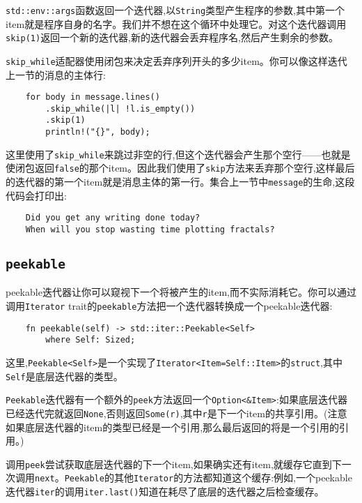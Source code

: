 \texttt{std::env::args}函数返回一个迭代器,以\texttt{String}类型产生程序的参数,其中第一个item就是程序自身的名字。我们并不想在这个循环中处理它。对这个迭代器调用\texttt{skip(1)}返回一个新的迭代器,新的迭代器会丢弃程序名,然后产生剩余的参数。

\texttt{skip\_while}适配器使用闭包来决定丢弃序列开头的多少item。你可以像这样迭代上一节的消息的主体行:
\begin{verbatim}
    for body in message.lines()
        .skip_while(|l| !l.is_empty())
        .skip(1)
        println!("{}", body);
\end{verbatim}

这里使用了\texttt{skip\_while}来跳过非空的行,但这个迭代器会产生那个空行——也就是使闭包返回\texttt{false}的那个item。因此我们使用了\texttt{skip}方法来丢弃那个空行,这样最后的迭代器的第一个item就是消息主体的第一行。集合上一节中\texttt{message}的生命,这段代码会打印出:
\begin{verbatim}
    Did you get any writing done today?
    When will you stop wasting time plotting fractals?
\end{verbatim}

\subsection{\texttt{peekable}}
peekable迭代器让你可以窥视下一个将被产生的item,而不实际消耗它。你可以通过调用\texttt{Iterator} trait的\texttt{peekable}方法把一个迭代器转换成一个peekable迭代器:
\begin{verbatim}
    fn peekable(self) -> std::iter::Peekable<Self>
        where Self: Sized;
\end{verbatim}
这里,\texttt{Peekable<Self>}是一个实现了\texttt{Iterator<Item=Self::Item>}的\texttt{struct},其中\texttt{Self}是底层迭代器的类型。

\texttt{Peekable}迭代器有一个额外的\texttt{peek}方法返回一个\texttt{Option<\&Item>}:如果底层迭代器已经迭代完就返回\texttt{None},否则返回\texttt{Some(r)},其中\texttt{r}是下一个item的共享引用。(注意如果底层迭代器的item的类型已经是一个引用,那么最后返回的将是一个引用的引用。)

调用\texttt{peek}尝试获取底层迭代器的下一个item,如果确实还有item,就缓存它直到下一次调用\texttt{next}。\texttt{Peekable}的其他\texttt{Iterator}的方法都知道这个缓存:例如,一个peekable迭代器\texttt{iter}的调用\texttt{iter.last()}知道在耗尽了底层的迭代器之后检查缓存。

